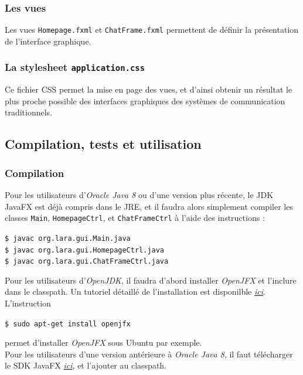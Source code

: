 \documentclass[10pt,a4paper]{article}
\begin{document}
\subsubsection{Les vues}

Les vues \texttt{Homepage.fxml} et \texttt{ChatFrame.fxml} permettent de définir la présentation de l'interface graphique.

\subsubsection{La stylesheet \texttt{application.css}}

Ce fichier CSS permet la mise en page des vues, et d'ainsi obtenir un résultat le plus proche possible des interfaces graphiques des systèmes de communication traditionnels.

\subsection{Compilation, tests et utilisation}

\subsubsection{Compilation}
Pour les utilisateurs d'\textit{Oracle Java 8} ou d'une version plus récente, le JDK JavaFX est déjà compris dans le JRE, et il faudra alors simplement compiler les classes \texttt{Main}, \texttt{HomepageCtrl}, et \texttt{ChatFrameCtrl} à l'aide des instructions :

\begin{center}
	\texttt{\$ javac org.lara.gui.Main.java} \\
	\texttt{\$ javac org.lara.gui.HomepageCtrl.java}\\
	\texttt{\$ javac org.lara.gui.ChatFrameCtrl.java}
\end{center}

Pour les utilisateurs d'\textit{OpenJDK}, il faudra d'abord installer \textit{OpenJFX} et l'inclure dans le classpath. Un tutoriel détaillé de l'installation est disponilble \href{https://wiki.openjdk.java.net/display/OpenJFX/Building+OpenJFX}{\textit{ici}}. L'instruction

\begin{center}
	\texttt{\$ sudo apt-get install openjfx}
\end{center}
permet d'installer \textit{OpenJFX} sous Ubuntu par exemple. \\

Pour les utilisateurs d'une version antérieure à \textit{Oracle Java 8}, il faut télécharger le SDK JavaFX \href{https://gluonhq.com/products/javafx/}{\textit{ici}}, et l'ajouter au classpath. \\
\end{document}
